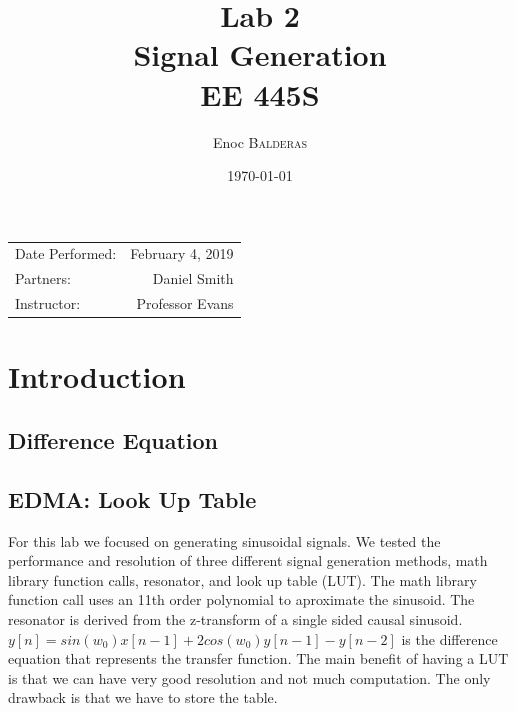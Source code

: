 \documentclass{article}
\title{Lab 2\\ Signal Generation\\ EE 445S} %
\author{Enoc \textsc{Balderas}} %
\date{\today} %
\begin{document}
\maketitle %

\begin{center}
\begin{tabular}{l r}
Date Performed: & February 4, 2019 \\ %
Partners: & Daniel Smith \\ %
Instructor: & Professor Evans %
\end{tabular}
\end{center}



\section{Introduction}

\subsection{Difference Equation}
\subsection{EDMA: Look Up Table}

For this lab we focused on generating sinusoidal signals. 
We tested the performance and resolution of three different signal generation methods, math library function calls, resonator, and look up table (LUT).
The math library function call uses an 11th order polynomial to aproximate the sinusoid.
The resonator is derived from the z-transform of a single sided causal sinusoid.
$y[n] = sin(w_0)x[n-1] + 2cos(w_0)y[n-1] - y[n-2]$ is the difference equation that represents the transfer function.
The main benefit of having a LUT is that we can have very good resolution and not much computation.
The only drawback is that we have to store the table.
 
\end{document}
